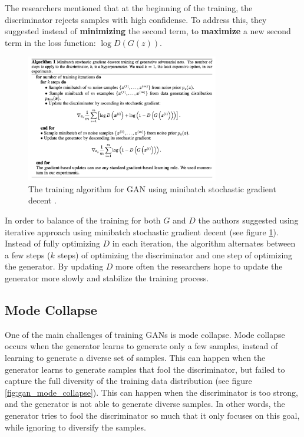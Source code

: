 The researchers mentioned that at the beginning of the training, the discriminator rejects samples with high confidense. To address this, they suggested instead of \textbf{minimizing} the second term, to \textbf{maximize} a new second term in the loss function: $\log D(G(z))$.


\begin{figure}
    \centering
    \includegraphics[width=0.75\textwidth]{images/gan_training.png}
    \caption{The training algorithm for GAN using minibatch stochastic gradient decent \cite{gan}.}
    \label{fig:gan_training}
\end{figure}

In order to balance of the training for both $G$ and $D$ the authors suggested using iterative approach using minibatch stochastic gradient decent (see figure \ref{fig:gan_training}). Instead of fully optimizing $D$ in each iteration, the algorithm alternates between a few steps ($k$ steps) of optimizing the discriminator and one step of optimizing the generator. By updating $D$ more often the researchers hope to update the generator more slowly and stabilize the training process.



\subsection{Mode Collapse}

One of the main challenges of training GANs is mode collapse. Mode collapse occurs when the generator learns to generate only a few samples, instead of learning to generate a diverse set of samples. This can happen when the generator learns to generate samples that fool the discriminator, but failed to capture the full diversity of the training data distribution (see figure \ref{fig:gan_mode_collapse}). This can happen when the discriminator is too strong, and the generator is not able to generate diverse samples. In other words, the generator tries to fool the discriminator so much that it only focuses on this goal, while ignoring to diversify the samples.

